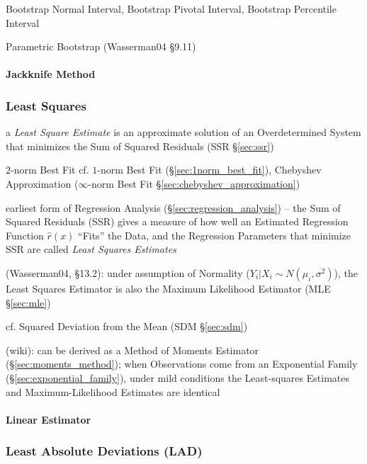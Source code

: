 Bootstrap Normal Interval, Bootstrap Pivotal Interval, Bootstrap Percentile
Interval

Parametric Bootstrap (Wasserman04 \S9.11)



\paragraph{Jackknife Method}\label{sec:jackknife_method}\hfill



\subsubsection{Least Squares}\label{sec:least_squares}

a \emph{Least Square Estimate} is an approximate solution of an Overdetermined
System that minimizes the Sum of Squared Residuals (SSR \S\ref{sec:ssr})

$2$-norm Best Fit \fist cf. $1$-norm Best Fit (\S\ref{sec:1norm_best_fit}),
Chebyshev Approximation ($\infty$-norm Best Fit
\S\ref{sec:chebyshev_approximation})

earliest form of Regression Analysis (\S\ref{sec:regression_analysis})
-- the Sum of Squared Residuals (SSR) gives a measure of how well
an Estimated Regression Function $\hat{r}(x)$ ``Fits'' the Data, and the
Regression Parameters that minimize SSR are called \emph{Least Squares
  Estimates}

(Wasserman04, \S13.2):
 under assumption of Normality ($Y_i | X_i \sim N(\mu_i, \sigma^2)$), the Least
 Squares Estimator is also the Maximum Likelihood Estimator (MLE
 \S\ref{sec:mle})

cf. Squared Deviation from the Mean (SDM \S\ref{sec:sdm})

(wiki): can be derived as a Method of Moments Estimator
(\S\ref{sec:moments_method});
when Observations come from an Exponential Family
(\S\ref{sec:exponential_family}), under mild conditions the Least-squares
Estimates and Maximum-Likelihood Estimates are identical



\paragraph{Linear Estimator}\label{sec:linear_estimator}\hfill




\subsubsection{Least Absolute Deviations (LAD)}\label{sec:lad}

